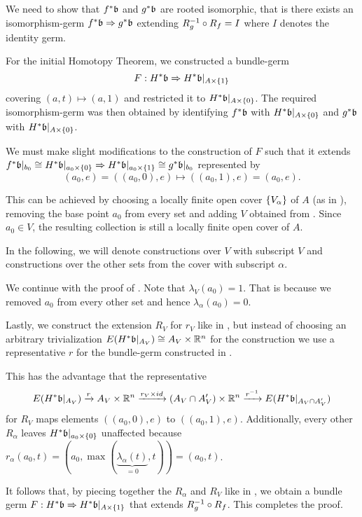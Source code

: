 \begin{myproof}
    We need to show that $\ind{f}\bb$ and $\ind{g}\bb$ are rooted isomorphic,
    that is there exists an isomorphism-germ $\germ{\ind{f}\bb}{\ind{g}\bb}$
    extending $R_g^{-1} \circ R_f = I$
    where $I$ denotes the identity germ.

    For the initial Homotopy Theorem,
    we constructed a bundle-germ
    \[ \germdef{F}{\ind{H}\bb}{\ind{H}\bb[\cylup{A}]} \]
    covering $(a, t) \mapsto (a, 1)$
    and restricted it to $\ind{H}\bb[\cyldown{A}]$.
    The required isomorphism-germ was then obtained by
    identifying $\ind{f}\bb$ with $\ind{H}\bb[\cyldown{A}]$ and
    $\ind{g}\bb$ with $\ind{H}\bb[\cyldown{A}]$.

    We must make slight modifications
    to the construction of $F$ such that it extends
    $\germ{\ind{f}\bbb \cong \ind{H}\bb[\cyldown{a_0}]}{\ind{H}\bb[\cylup{a_0}] \cong \ind{g}\bbb}$
    represented by
    \[ (a_0, e) = ((a_0, 0), e) \mapsto ((a_0, 1), e) = (a_0, e). \]

    This can be achieved by choosing a locally finite open cover $\{V_\alpha\}$
    of $A$ (as in ), removing the base point $a_0$ from every set
    and adding $V$ obtained from .
    Since $a_0 \in V$, the resulting collection is still a
    locally finite open cover of $A$.
    
    In the following, we will denote constructions over $V$
    with subscript $V$ and constructions over the other sets
    from the cover with subscript $\alpha$.

    We continue with the proof of .
    Note that $\lambda_V(a_0) = 1$.
    That is because we removed $a_0$ from every other set and hence $\lambda_\alpha(a_0) = 0$.

    Lastly, we construct the extension $R_V$ for $r_V$
    like in ,
    but instead of choosing an arbitrary trivialization
    $E(\ind{H}\bb\restr{A_V}) \cong A_V \cross \R^n$
    for the construction we use a representative $r$
    for the bundle-germ constructed in .
    
    This has the advantage that the representative
    \[
        E(\ind{H}\bb[A_V]) \xto{r}
        A_V \cross \R^n \xto{r_V \cross id} (A_V \cap A'_V) \cross \R^n
        \xto{\inv{r}} E(\ind{H}\bb[A_V \cap A'_V])
    \]
    for $R_V$ maps elements $((a_0, 0), e)$ to $((a_0, 1), e)$.
    Additionally,
    every other $R_\alpha$ leaves $\ind{H}\bb[\cyldown{a_0}]$ unaffected
    because $r_\alpha(a_0, t) = (a_0, \max(\underbrace{\lambda_\alpha(t)}_{= 0}, t)) = (a_0, t)$.

    It follows that, by piecing together the $R_\alpha$ and $R_V$ like in ,
    we obtain a bundle germ $\germdef{F}{\ind{H}\bb}{\ind{H}\bb[\cylup{A}]}$
    that extends $R_g^{-1} \circ R_f$.
    This completes the proof.
\end{myproof}